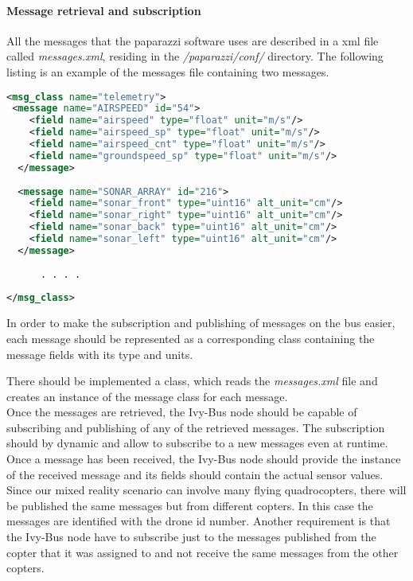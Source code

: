 \paragraph{Message retrieval and subscription}
\label{par:messageRetrieval}

All the messages that the paparazzi software uses are described in a xml file called \textit{messages.xml}, residing in the \textit{/paparazzi/conf/} directory. The following listing is an example of the messages file containing two messages.

\begin{lstlisting}[basicstyle=\tiny, caption={Message Xml definition}, label={lst:MessageXml}, language = Xml]
<msg_class name="telemetry">
 <message name="AIRSPEED" id="54">
    <field name="airspeed" type="float" unit="m/s"/>
    <field name="airspeed_sp" type="float" unit="m/s"/>
    <field name="airspeed_cnt" type="float" unit="m/s"/>
    <field name="groundspeed_sp" type="float" unit="m/s"/>
  </message>
  
  <message name="SONAR_ARRAY" id="216">
	<field name="sonar_front" type="uint16" alt_unit="cm"/>
	<field name="sonar_right" type="uint16" alt_unit="cm"/>
	<field name="sonar_back" type="uint16" alt_unit="cm"/>
	<field name="sonar_left" type="uint16" alt_unit="cm"/>
  </message>
	
	  . . . . 
	  
</msg_class>
\end{lstlisting}

In order to make the subscription and publishing of messages on the bus easier, each message should be represented as a corresponding class containing the message fields with its type and units.

There should be implemented a class, which reads the \textit{messages.xml} file and creates an instance of the message class for each message. \\
Once the messages are retrieved, the Ivy-Bus node should be capable of subscribing and publishing of any of the retrieved messages. The subscription should by dynamic and allow to subscribe to a new messages even at runtime. \\
Once a message has been received, the Ivy-Bus node should provide the instance of the received message and its fields should contain the actual sensor values.\\
Since our mixed reality scenario can involve many flying quadrocopters, there will be published the same messages but from different copters. In this case the messages are identified with the drone id number.
Another requirement is that the Ivy-Bus node have to subscribe just to the messages published from the copter that it was assigned to and not receive the same messages from the other copters.

